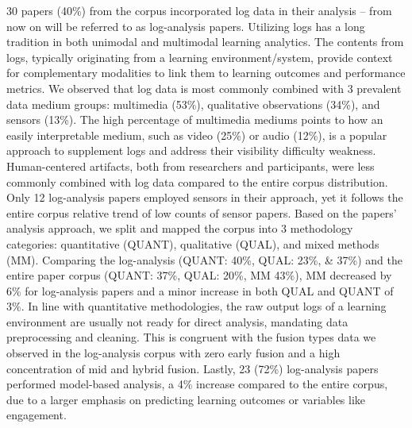 \documentclass[manuscript,screen,review]{acmart}
\begin{document}
30 papers (40\%) from the corpus incorporated log data in their analysis -- from now on will be referred to as log-analysis papers. Utilizing logs has a long tradition in both unimodal and multimodal learning analytics. The contents from logs, typically originating from a learning environment/system, provide context for complementary modalities to link them to learning outcomes and performance metrics. We observed that log data is most commonly combined with 3 prevalent data medium groups: multimedia (53\%), qualitative observations (34\%), and sensors (13\%). The high percentage of multimedia mediums points to how an easily interpretable medium, such as video (25\%) or audio (12\%), is a popular approach to supplement logs and address their visibility difficulty weakness. Human-centered artifacts, both from researchers and participants, were less commonly combined with log data compared to the entire corpus distribution. Only 12 log-analysis papers employed sensors in their approach, yet it follows the entire corpus relative trend of low counts of sensor papers. Based on the papers' analysis approach, we split and mapped the corpus into 3 methodology categories: quantitative (QUANT), qualitative (QUAL), and mixed methods (MM). Comparing the log-analysis (QUANT: 40\%, QUAL: 23\%, \& 37\%) and the entire paper corpus (QUANT: 37\%, QUAL: 20\%, MM 43\%), MM decreased by 6\% for log-analysis papers and a minor increase in both QUAL and QUANT of 3\%. In line with quantitative methodologies, the raw output logs of a learning environment are usually not ready for direct analysis, mandating data preprocessing and cleaning. This is congruent with the fusion types data we observed in the log-analysis corpus with zero early fusion and a high concentration of mid and hybrid fusion. Lastly, 23 (72\%) log-analysis papers performed model-based analysis, a 4\% increase compared to the entire corpus, due to a larger emphasis on predicting learning outcomes or variables like engagement.
\end{document}
